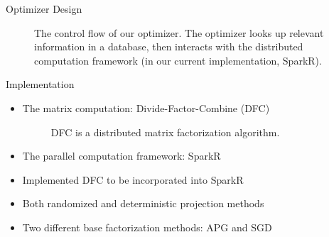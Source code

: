 \documentclass[final]{beamer}
\begin{document}
{\begin{frame}{}
\begin{center}
\begin{columns}[t]
\begin{column}{0.32\textwidth}
\begin{block}{\huge Optimizer Design}
\begin{center}
\begin{figure}
\caption[width=0.6\textwidth]{The control flow of our optimizer. The optimizer looks up relevant information in a database, then interacts with the distributed computation framework (in our current implementation, SparkR).}
\end{figure}
\end{center}




\end{block}

\vspace{1.5cm}

    \begin{block}{\huge Implementation}

\vspace{.5cm}
\begin{itemize}
\item The matrix computation: Divide-Factor-Combine (DFC)
\vspace{.2cm}
\begin{figure}
\caption[width=0.6\textwidth]{DFC is a distributed matrix factorization algorithm.}
\end{figure}
\vspace{.2cm}
\item The parallel computation framework: SparkR
\item Implemented DFC to be incorporated into SparkR
\item Both randomized and deterministic projection methods
\item Two different base factorization methods: APG and SGD
\end{itemize}
\vspace{.5cm}


\end{block}
\end{column}
\end{columns}
\end{center}
\end{frame}}
\end{document}

